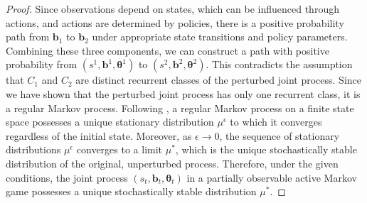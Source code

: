\begin{proof}
    Since observations depend on states, which can be influenced through actions,
    and actions are determined by policies, there is a positive probability path from
    $\boldsymbol{b}_{1}$ to $\boldsymbol{b}_{2}$ under appropriate state transitions
    and policy parameters. Combining these three components, we can construct a path
    with positive probability from $(s^{1}, \boldsymbol{b}^{1}, \boldsymbol{\theta}
        ^{1})$ to $(s^{2}, \boldsymbol{b}^{2}, \boldsymbol{\theta}^{2})$. This
    contradicts the assumption that $C_{1}$ and $C_{2}$ are distinct recurrent
    classes of the perturbed joint process. Since we have shown that the perturbed
    joint process has only one recurrent class, it is a regular Markov process. Following
    \citep{kim2022influencing,wicks2012algorithmcomputingstochasticallystable}, a regular Markov
    process on a finite state space possesses a unique stationary distribution
    $\mu^{\epsilon}$ to which it converges regardless of the initial state. Moreover,
    as $\epsilon \to 0$, the sequence of stationary distributions $\mu^{\epsilon}$
    converges to a limit $\mu^{*}$, which is the unique stochastically stable
    distribution of the original, unperturbed process. Therefore, under the given conditions,
    the joint process $(s_{t}, \boldsymbol{b}_{t}, \boldsymbol{\theta}_{t})$ in a
    partially observable active Markov game possesses a unique stochastically
    stable distribution $\mu^{*}$.
\end{proof}
